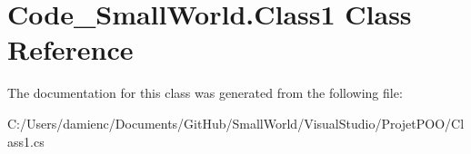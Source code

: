 \hypertarget{class_code___small_world_1_1_class1}{\section{Code\-\_\-\-Small\-World.\-Class1 Class Reference}
\label{class_code___small_world_1_1_class1}
}


The documentation for this class was generated from the following file\-:\begin{DoxyCompactItemize}
\item 
C\-:/\-Users/damienc/\-Documents/\-Git\-Hub/\-Small\-World/\-Visual\-Studio/\-Projet\-P\-O\-O/Class1.\-cs\end{DoxyCompactItemize}
